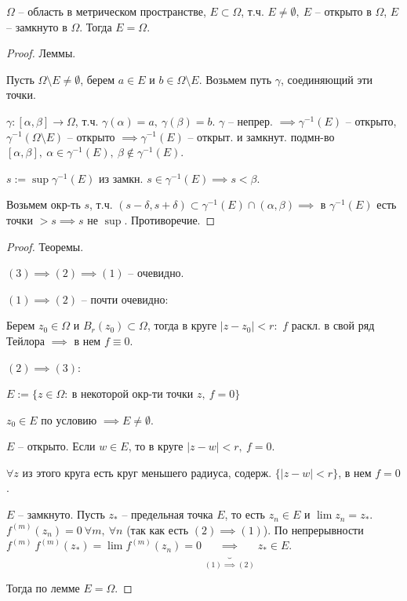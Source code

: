\begin{lemma}
    $\Omega$ -- область в метрическом пространстве, $E \subset \Omega$, т.ч. $E \not = \emptyset, \ E$ -- открыто в $\Omega$, $E$ -- замкнуто в $\Omega$. Тогда $E = \Omega$.
\end{lemma}
\begin{proof} Леммы.

    Пусть $\Omega \setminus E \not = \emptyset$, берем $a \in E$ и $b \in \Omega \setminus E$. Возьмем путь $\gamma$, соединяющий эти точки.

    $\gamma: [\alpha, \beta] \rightarrow \Omega$, т.ч. $\gamma(\alpha) = a, \ \gamma(\beta) = b$. $\gamma$ -- непрер. $\implies \gamma^{-1} (E)$ -- открыто, $\gamma^{-1}(\Omega \setminus E)$ -- открыто $\implies \gamma^{-1}(E)$ -- открыт. и замкнут. подмн-во $[\alpha, \beta], \ \alpha \in \gamma^{-1}(E), \ \beta \not \in \gamma^{-1}(E)$.

    $s := \sup{\gamma^{-1} (E)}$ из замкн. $s \in \gamma^{-1} (E) \implies s < \beta$.


    Возьмем окр-ть $s$, т.ч. $(s - \delta, s + \delta) \subset \gamma^{-1}(E) \cap (\alpha, \beta) \implies $ в $\gamma^{-1}(E)$ есть точки $> s \implies s $ не $\sup$. Противоречие. 
\end{proof}

\begin{proof}
    Теоремы.

    $(3) \implies (2) \implies (1)$ -- очевидно.

    $(1) \implies (2)$ -- почти очевидно:

    Берем $z_0 \in \Omega$ и $B_r(z_0) \subset \Omega$, тогда в круге $|z - z_0| < r: $ $f$ раскл. в свой ряд Тейлора $\implies$ в нем $f \equiv 0$.

    $(2) \implies (3)$:

    $E := \{ z \in \Omega: \ \text{в некоторой окр-ти точки } z, \ f = 0 \}$

    $z_0 \in E$ по условию $\implies E \not = \emptyset$.

    $E$ -- открыто. Если $w \in E$, то в круге $|z - w| < r, \ f = 0$.

    $\forall z$ из этого круга есть круг меньшего радиуса, содерж. $\{ |z - w| < r \}$, в нем $f = 0$.

    $E$ -- замкнуто. Пусть $z_*$ -- предельная точка $E$, то есть $z_n \in E$ и $\lim{z_n} = z_*$. $f^{(m)} (z_n) = 0 \ \forall m, \ \forall n$ (так как есть $(2) \implies (1)$). По непрерывности $f^{(m)} \ f^{(m)} (z_*) = \lim{f^{(m)} (z_n)} = 0 \underbrace{\implies}_{(1) \implies (2)} z_* \in E$.

    Тогда по лемме $E = \Omega$.
\end{proof}


